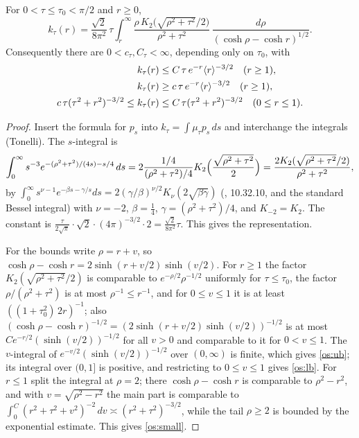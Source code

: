 \begin{lemma}\label{os:poisson}
For $0<\tau\le\tau_0<\pi/2$ and $r\ge0$,
\[
k_\tau(r)=\frac{\sqrt2}{8\pi^2}\,\tau\int_r^\infty\frac{\rho\,K_2\bigl(\sqrt{\rho^2+\tau^2}/2\bigr)}{\rho^2+\tau^2}\,\frac{d\rho}{(\cosh\rho-\cosh r)^{1/2}}.
\]
Consequently there are $0<c_\tau,C_\tau<\infty$, depending only on $\tau_0$, with
\begin{align}
k_\tau(r)&\le C\,\tau\,e^{-r}\langle r\rangle^{-3/2}\quad(r\ge1),\label{os:ub}\\
k_\tau(r)&\ge c\,\tau\,e^{-r}\langle r\rangle^{-3/2}\quad(r\ge1),\label{os:lb}\\
c\,\tau(\tau^2+r^2)^{-3/2}\le k_\tau(r)&\le C\,\tau(\tau^2+r^2)^{-3/2}\quad(0\le r\le1).\label{os:small}
\end{align}
\end{lemma}
\begin{proof}
Insert the formula for $p_s$ into $k_\tau=\int\mu_\tau p_s\,ds$ and interchange the integrals (Tonelli). The $s$-integral is
\[
\int_0^\infty s^{-3}e^{-(\rho^2+\tau^2)/(4s)-s/4}\,ds=2\frac{1/4}{(\rho^2+\tau^2)/4}K_2\Bigl(\frac{\sqrt{\rho^2+\tau^2}}2\Bigr)
=\frac{2K_2(\sqrt{\rho^2+\tau^2}/2)}{\rho^2+\tau^2},
\]
by $\int_0^\infty s^{\nu-1}e^{-\beta s-\gamma/s}ds=2(\gamma/\beta)^{\nu/2}K_\nu(2\sqrt{\beta\gamma})$ (\cite{DLMF}, 10.32.10, and the
standard Bessel integral) with $\nu=-2$, $\beta=\tfrac14$, $\gamma=(\rho^2+\tau^2)/4$, and $K_{-2}=K_2$. The constant is
$\tfrac{\tau}{2\sqrt\pi}\cdot\sqrt2\cdot(4\pi)^{-3/2}\cdot2=\tfrac{\sqrt2}{8\pi^2}\tau$. This gives the representation.

For the bounds write $\rho=r+v$, so $\cosh\rho-\cosh r=2\sinh(r+v/2)\sinh(v/2)$. For $r\ge1$ the factor
$K_2(\sqrt{\rho^2+\tau^2}/2)$ is comparable to $e^{-\rho/2}\rho^{-1/2}$ uniformly for $\tau\le\tau_0$, the factor $\rho/(\rho^2+\tau^2)$
is at most $\rho^{-1}\le r^{-1}$, and for $0\le v\le1$ it is at least $((1+\tau_0^2)\,2r)^{-1}$; also $(\cosh\rho-\cosh r)^{-1/2}=(2\sinh(r+v/2)\sinh(v/2))^{-1/2}$ is at most $Ce^{-r/2}(\sinh(v/2))^{-1/2}$ for all $v>0$ and comparable to it for $0<v\le1$. The $v$-integral of
$e^{-v/2}(\sinh(v/2))^{-1/2}$ over $(0,\infty)$ is finite, which gives \eqref{os:ub}; its integral over $(0,1]$ is positive, and restricting to $0\le v\le1$ gives \eqref{os:lb}. For $r\le1$ split the
integral at $\rho=2$; there $\cosh\rho-\cosh r$ is comparable to $\rho^2-r^2$, and with $v=\sqrt{\rho^2-r^2}$ the main part is
comparable to $\int_0^{C}(r^2+\tau^2+v^2)^{-2}\,dv\asymp(r^2+\tau^2)^{-3/2}$, while the tail $\rho\ge2$ is bounded by the
exponential estimate. This gives \eqref{os:small}.
\end{proof}

